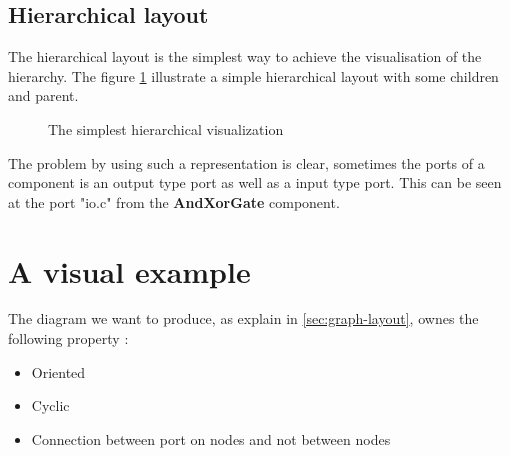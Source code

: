 \subsection{Hierarchical layout}

The hierarchical layout is the simplest way to achieve the visualisation of the hierarchy. The figure \ref{fig:hierarchical-layout-simple} illustrate a simple hierarchical layout with some children and parent.

\begin{figure}[h]
  \centering
  \caption[Simple hierarchical layout for diagram visualization]{The simplest hierarchical visualization}
  \label{fig:hierarchical-layout-simple}
\end{figure}

The problem by using such a representation is clear, sometimes the ports of a component is an output type port as well as a input type port. This can be seen at the port "io.c" from the \textbf{AndXorGate} component.

\section{A visual example}

The diagram we want to produce, as explain in \ref{sec:graph-layout}, ownes the following property :
\begin{itemize}
  \item Oriented
  \item Cyclic
  \item Connection between port on nodes and not between nodes
\end{itemize}

